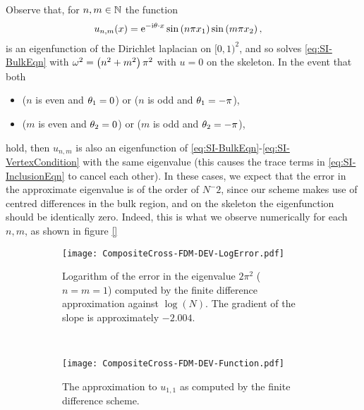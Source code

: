 Observe that, for $n,m\in\mathbb{N}$ the function
\begin{align*}
	u_{n,m}(x) &= \mathrm{e}^{-\mathrm{i}\theta\cdot x}\sin\left( n\pi x_1 \right)\sin\left( m\pi x_2 \right),
\end{align*}
is an eigenfunction of the Dirichlet laplacian on $[0,1)^2$, and so solves \eqref{eq:SI-BulkEqn} with $\omega^2 = \left( n^2+m^2 \right)\pi^2$ with $u=0$ on the skeleton.
In the event that both
\begin{itemize}
	\item ($n$ is even and $\theta_1=0$) or ($n$ is odd and $\theta_1=-\pi$),
	\item ($m$ is even and $\theta_2=0$) or ($m$ is odd and $\theta_2=-\pi$),
\end{itemize}
hold, then $u_{n,m}$ is also an eigenfunction of \eqref{eq:SI-BulkEqn}-\eqref{eq:SI-VertexCondition} with the same eigenvalue (this causes the trace terms in \eqref{eq:SI-InclusionEqn} to cancel each other). 
In these cases, we expect that the error in the approximate eigenvalue is of the order of $N^-2$, since our scheme makes use of centred differences in the bulk region, and on the skeleton the eigenfunction should be identically zero.
Indeed, this is what we observe numerically for each $n,m$, as shown in figure \ref{}
\begin{figure}[h]
	\centering
	\begin{subfigure}[t]{0.35\textwidth}
		\centering
		\texttt{[image: CompositeCross-FDM-DEV-LogError.pdf]}
		\caption{\label{fig:CompositeCross-FDM-DEV-LogError} Logarithm of the error in the eigenvalue $2\pi^2$ ($n=m=1$) computed by the finite difference approximation against $\log(N)$. The gradient of the slope is approximately $-2.004$.}
	\end{subfigure}
	~
	\begin{subfigure}[t]{0.65\textwidth}
		\centering
		\texttt{[image: CompositeCross-FDM-DEV-Function.pdf]}
		\caption{\label{fig:CompositeCross-FDM-DEV-Function} The approximation to $u_{1,1}$ as computed by the finite difference scheme.}
	\end{subfigure}
	\caption{\label{fig:}}
\end{figure}

